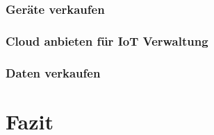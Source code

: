 \subsubsection{Geräte verkaufen} %

\subsubsection{Cloud anbieten für IoT Verwaltung} %

\subsubsection{Daten verkaufen}%

\section{Fazit}

